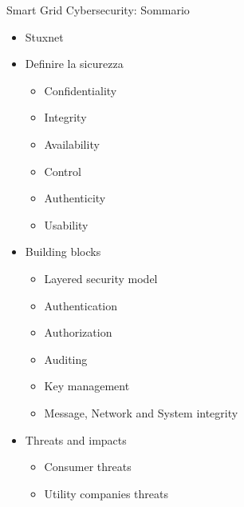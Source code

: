 \begin{frame}{Smart Grid Cybersecurity: Sommario}
\begin{itemize}
\item Stuxnet
\item Definire la sicurezza
	\begin{itemize}
	\item Confidentiality
	\item Integrity
	\item Availability
	\item Control
	\item Authenticity
	\item Usability
	\end{itemize}
\item Building blocks
	\begin{itemize}
		\item Layered security model
		\item Authentication
		\item Authorization
		\item Auditing
		\item Key management
		\item Message, Network and System integrity
	\end{itemize}
\item Threats and impacts
	\begin{itemize}
		\item Consumer threats
		\item Utility companies threats
	\end{itemize}
\end{itemize}
\end{frame}


